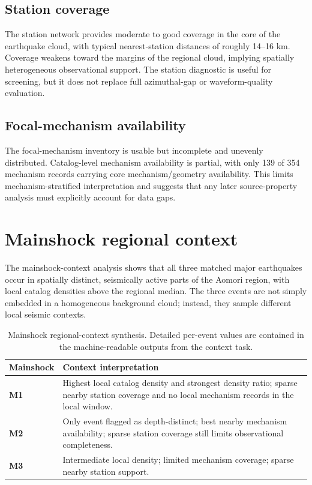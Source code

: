 \documentclass[11pt]{article}
\begin{document}
\subsection{Station coverage}
The station network provides moderate to good coverage in the core of the earthquake cloud, with typical nearest-station distances of roughly 14--16 km. Coverage weakens toward the margins of the regional cloud, implying spatially heterogeneous observational support. The station diagnostic is useful for screening, but it does not replace full azimuthal-gap or waveform-quality evaluation.

\subsection{Focal-mechanism availability}
The focal-mechanism inventory is usable but incomplete and unevenly distributed. Catalog-level mechanism availability is partial, with only 139 of 354 mechanism records carrying core mechanism/geometry availability. This limits mechanism-stratified interpretation and suggests that any later source-property analysis must explicitly account for data gaps.

\section{Mainshock regional context}
The mainshock-context analysis shows that all three matched major earthquakes occur in spatially distinct, seismically active parts of the Aomori region, with local catalog densities above the regional median. The three events are not simply embedded in a homogeneous background cloud; instead, they sample different local seismic contexts.

\begin{table}[H]
\centering
\caption{Mainshock regional-context synthesis. Detailed per-event values are contained in the machine-readable outputs from the context task.}
\begin{tabularx}{\textwidth}{>{\bfseries}l X}
\toprule
Mainshock & Context interpretation \\
\midrule
M1 & Highest local catalog density and strongest density ratio; sparse nearby station coverage and no local mechanism records in the local window. \\
M2 & Only event flagged as depth-distinct; best nearby mechanism availability; sparse station coverage still limits observational completeness. \\
M3 & Intermediate local density; limited mechanism coverage; sparse nearby station support. \\
\bottomrule
\end{tabularx}
\end{table}
\end{document}
